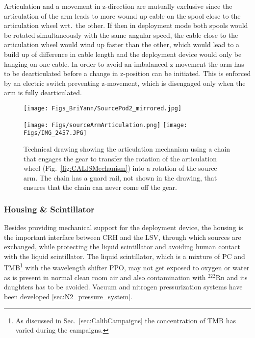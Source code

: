
Articulation and a movement in z-direction are mutually exclusive since the articulation of the arm leads to more wound up cable on the spool close to the articulation wheel wrt.~the other. If then in deployment mode both spools would be rotated simultaneously with the same angular speed, the cable close to the articulation wheel would wind up faster than the other, which would lead to a build up of difference in cable length and the deployment device would only be hanging on one cable. In order to avoid an imbalanced z-movement the arm has to be dearticulated before a change in z-position can be initiated. This is enforced by an electric switch preventing z-movement, which is disengaged only when the arm is fully dearticulated. 

\begin{figure}[htbp]
 \centering
\begin{minipage}[b]{0.48\textwidth}
\centering
  \texttt{[image: Figs\_BriYann/SourcePod2\_mirrored.jpg]}
\end{minipage}
\begin{minipage}[b]{0.48\textwidth}
\centering
  \texttt{[image: Figs/sourceArmArticulation.png]}
  \texttt{[image: Figs/IMG\_2457.JPG]}
\end{minipage}
  \caption{Technical drawing showing the articulation mechanism using a chain that engages the gear to transfer the rotation of the articulation wheel (Fig.~\ref{fig:CALISMechanism}) into a rotation of the source arm. The chain has a guard rail, not shown in the drawing, that ensures that the chain can never come off the gear.}
  \label{fig:sourceArmRotation}
\end{figure} 

\subsubsection{Housing \& Scintillator}

Besides providing mechanical support for the deployment device, the housing is the important interface between CRH and the LSV, through which sources are exchanged, while protecting the liquid scintillator and avoiding human contact with the liquid scintillator. The liquid scintillator, which is a mixture of PC and TMB\footnote{As discussed in Sec.~\ref{sec:CalibCampaigns} the concentration of TMB has varied during the campaigns.} with the wavelength shifter PPO\cite{DS50:firstPaper}, may not get exposed to oxygen or water as is present in normal clean room air and also contamination with $^{222}$Rn and its daughters has to be avoided. Vacuum and nitrogen pressurization systems have been developed \ref{sec:N2_pressure_system}.

